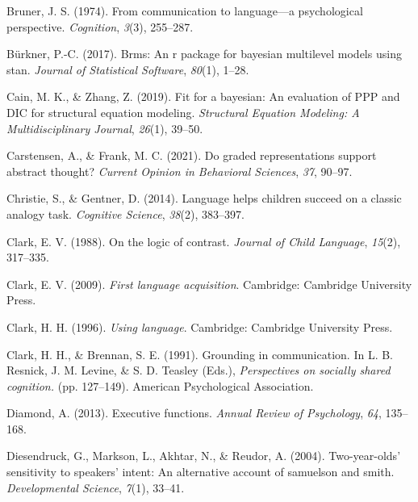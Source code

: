 \documentclass[
  man,floatsintext]{apa6}
\newlength{\cslhangindent}
\newlength{\cslentryspacingunit} %
\newenvironment{CSLReferences}[2] %
 {%
  \setlength{\parindent}{0pt}
  \ifodd #1
  \let\oldpar\par
  \def\par{\hangindent=\cslhangindent\oldpar}
  \fi
  \setlength{\parskip}{#2\cslentryspacingunit}
 }%
 {}
\begin{document}
\begin{CSLReferences}{1}{0}
\leavevmode{}%
Bruner, J. S. (1974). From communication to language---a psychological perspective. \emph{Cognition}, \emph{3}(3), 255--287.

\leavevmode{}%
Bürkner, P.-C. (2017). Brms: An r package for bayesian multilevel models using stan. \emph{Journal of Statistical Software}, \emph{80}(1), 1--28.

\leavevmode{}%
Cain, M. K., \& Zhang, Z. (2019). Fit for a bayesian: An evaluation of PPP and DIC for structural equation modeling. \emph{Structural Equation Modeling: A Multidisciplinary Journal}, \emph{26}(1), 39--50.

\leavevmode{}%
Carstensen, A., \& Frank, M. C. (2021). Do graded representations support abstract thought? \emph{Current Opinion in Behavioral Sciences}, \emph{37}, 90--97.

\leavevmode{}%
Christie, S., \& Gentner, D. (2014). Language helps children succeed on a classic analogy task. \emph{Cognitive Science}, \emph{38}(2), 383--397.

\leavevmode{}%
Clark, E. V. (1988). On the logic of contrast. \emph{Journal of Child Language}, \emph{15}(2), 317--335.

\leavevmode{}%
Clark, E. V. (2009). \emph{First language acquisition}. Cambridge: Cambridge University Press.

\leavevmode{}%
Clark, H. H. (1996). \emph{Using language}. Cambridge: Cambridge University Press.

\leavevmode{}%
Clark, H. H., \& Brennan, S. E. (1991). Grounding in communication. In L. B. Resnick, J. M. Levine, \& S. D. Teasley (Eds.), \emph{Perspectives on socially shared cognition.} (pp. 127--149). American Psychological Association.

\leavevmode{}%
Diamond, A. (2013). Executive functions. \emph{Annual Review of Psychology}, \emph{64}, 135--168.

\leavevmode{}%
Diesendruck, G., Markson, L., Akhtar, N., \& Reudor, A. (2004). Two-year-olds' sensitivity to speakers' intent: An alternative account of samuelson and smith. \emph{Developmental Science}, \emph{7}(1), 33--41.


\end{CSLReferences}
\end{document}
